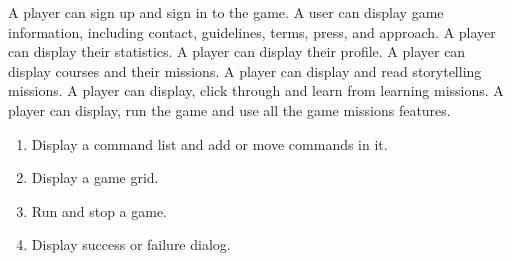 \begin{enumerate}[label=\textbf{F\arabic*}, ref=F\arabic*]
     A player can sign up and sign in to the game.
     A user can display game information, including contact, guidelines, terms, press, and approach.
     A player can display their statistics.
     A player can display their profile.
     A player can display courses and their missions.
     A player can display and read storytelling missions.
     A player can display, click through and learn from learning missions.
     A player can display, run the game and use all the game missions features. 
    \begin{enumerate}
        \item Display a command list and add or move commands in it.
        \item Display a game grid.
        \item Run and stop a game.
        \item Display success or failure dialog.
    \end{enumerate}
\end{enumerate}

\blind[8] 